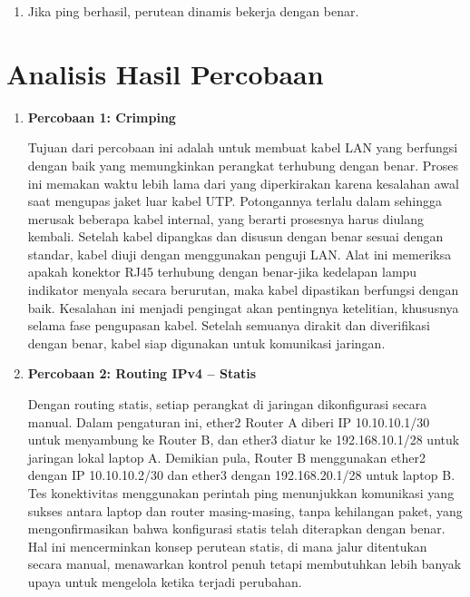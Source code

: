 \begin{enumerate}
\begin{enumerate}
\begin{center}
        \end{center}
        \item Jika ping berhasil, perutean dinamis bekerja dengan benar.
    \end{enumerate}

\end{enumerate}

\section{Analisis Hasil Percobaan}
\begin{enumerate}
    \item \textbf{Percobaan 1: Crimping}
    
    Tujuan dari percobaan ini adalah untuk membuat kabel LAN 
    yang berfungsi dengan baik yang memungkinkan perangkat 
    terhubung dengan benar. Proses ini memakan waktu lebih lama dari yang 
    diperkirakan karena kesalahan awal saat mengupas jaket luar kabel UTP. 
    Potongannya terlalu dalam sehingga merusak beberapa kabel internal, 
    yang berarti prosesnya harus diulang kembali. Setelah kabel dipangkas 
    dan disusun dengan benar sesuai dengan standar, kabel diuji dengan 
    menggunakan penguji LAN. Alat ini memeriksa apakah konektor RJ45 
    terhubung dengan benar-jika kedelapan lampu indikator menyala secara 
    berurutan, maka kabel dipastikan berfungsi dengan baik. Kesalahan ini 
    menjadi pengingat akan pentingnya ketelitian, khususnya selama fase 
    pengupasan kabel. Setelah semuanya dirakit dan diverifikasi dengan benar, 
    kabel siap digunakan untuk komunikasi jaringan.

    \item \textbf{Percobaan 2: Routing IPv4 -- Statis}
    
    Dengan routing statis, setiap perangkat di jaringan dikonfigurasi secara 
    manual. Dalam pengaturan ini, ether2 Router A diberi IP 10.10.10.1/30 
    untuk menyambung ke Router B, dan ether3 diatur ke 192.168.10.1/28 untuk 
    jaringan lokal laptop A. Demikian pula, Router B menggunakan ether2 
    dengan IP 10.10.10.2/30 dan ether3 dengan 192.168.20.1/28 untuk laptop 
    B. Tes konektivitas menggunakan perintah ping menunjukkan komunikasi 
    yang sukses antara laptop dan router masing-masing, tanpa kehilangan 
    paket, yang mengonfirmasikan bahwa konfigurasi statis telah diterapkan 
    dengan benar. Hal ini mencerminkan konsep perutean statis, di mana 
    jalur ditentukan secara manual, menawarkan kontrol penuh tetapi 
    membutuhkan lebih banyak upaya untuk mengelola ketika terjadi perubahan.
    

\end{enumerate}
